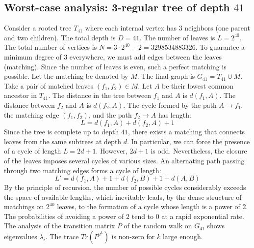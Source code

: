 \documentclass[11pt,a4paper]{article}
\begin{document}
\subsection{Worst-case analysis: 3-regular tree of depth $41$}
Consider a rooted tree $T_{41}$ where each internal vertex has 3 neighbors (one parent and two children).
The total depth is $D = 41$.
The number of leaves is $L = 2^{40}$.
The total number of vertices is $N = 3 \cdot 2^{40} - 2 = 3298534883326$.
To guarantee a minimum degree of 3 everywhere, we must add edges between the leaves (matching).
Since the number of leaves is even, such a perfect matching is possible.
Let the matching be denoted by $M$. The final graph is $G_{41} = T_{41} \cup M$.
Take a pair of matched leaves $(f_1, f_2) \in M$.
Let $A$ be their lowest common ancestor in $T_{41}$.
The distance in the tree between $f_1$ and $A$ is $d(f_1, A)$.
The distance between $f_2$ and $A$ is $d(f_2, A)$.
The cycle formed by the path $A \to f_1$, the matching edge $(f_1, f_2)$, and the path $f_2 \to A$ has length:
$$ L = d(f_1, A) + d(f_2, A) + 1 $$
Since the tree is complete up to depth $41$, there exists a matching that connects leaves from the same subtrees at depth $d$.
In particular, we can force the presence of a cycle of length $L = 2d + 1$. However, $2d+1$ is odd.
Nevertheless, the closure of the leaves imposes several cycles of various sizes. An alternating path passing through two matching edges forms a cycle of length:
$$ L' = d(f_1, A) + 1 + d(f_2, B) + 1 + d(A, B) $$
By the principle of recursion, the number of possible cycles considerably exceeds the space of available lengths, which inevitably leads, by the dense structure of matchings on $2^{40}$ leaves, to the formation of a cycle whose length is a power of 2. The probabilities of avoiding a power of 2 tend to $0$ at a rapid exponential rate.
The analysis of the transition matrix $P$ of the random walk on $G_{41}$ shows eigenvalues $\lambda_i$. The trace $Tr(P^{2^k})$ is non-zero for $k$ large enough.
\end{document}

